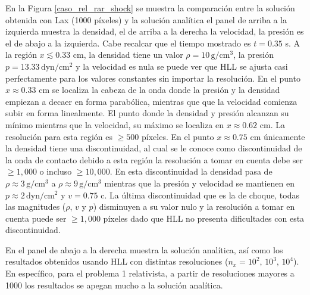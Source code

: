 \documentclass[12pt,a4paper]{book}
\begin{document}
En la Figura \ref{caso_rel_rar_shock} se muestra la comparación entre la solución obtenida con Lax
(1000 píxeles) y la solución analítica
el panel de arriba a la izquierda muestra la densidad, el de 
arriba a la derecha la velocidad, la presión es el de abajo a la izquierda. Cabe recalcar que  el 
tiempo mostrado es  $t = 0.35$ s.
A la región $x \lesssim 0.33$ cm, la densidad tiene un valor $\rho = 10 \,  \text{g}/ \text{cm}^3$, 
la presión $p = 13.33 \,  \text{dyn}/ \text{cm}^2 $
y la velocidad es nula se puede ver que HLL se ajusta casi perfectamente para los valores constantes
sin importar la resolución. 
En el punto $x \approx 0.33$ cm se localiza la cabeza de la onda donde la presión y la densidad 
empiezan a decaer en forma parabólica, mientras que que la velocidad comienza subir en forma linealmente.
El punto donde la densidad y presión alcanzan su mínimo mientras que la velocidad, su máximo
se localiza en $x \approx 0.62$ cm. La resolución para esta región es $\geq 500$ 
píxeles. En el punto $x \approx 0.75$ cm únicamente 
la densidad tiene una discontinuidad, al cual se le conoce como discontinuidad de la onda de contacto
debido a esta región la resolución a tomar en cuenta debe ser $\geq 1,000$ o incluso $\geq 10,000$.
En esta discontinuidad la densidad pasa de $ \rho \approx 3 \,  \text{g}/ \text{cm}^3$ a
$ \rho \approx 9 \,  \text{g}/ \text{cm}^3$ mientras que la presión 
y velocidad se mantienen en $p \approx 2\,  \text{dyn}/ \text{cm}^2 $ 
y $v = 0.75$ c. La última discontinuidad que es la de choque,
todas las magnitudes ($\rho$, $v$ y $p$) disminuyen a su valor nulo y la resolución a tomar en cuenta
puede ser $\geq 1,000$ píxeles dado que HLL no presenta dificultades con esta discontinuidad.

En el panel de abajo a la derecha muestra la solución analítica, así como los resultados obtenidos 
usando HLL con distintas resoluciones ($n_x = 10^2, \, 10^3, \,10^4$).  
En específico, para el problema 1 relativista, a partir de resoluciones mayores a 1000 los
resultados se apegan mucho a la solución analítica.
\end{document}
